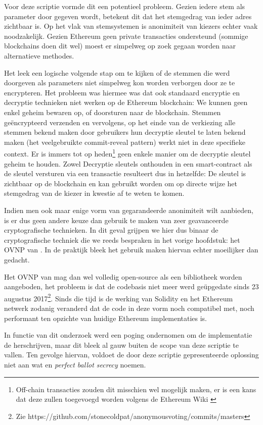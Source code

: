 	Voor deze scriptie vormde dit een potentieel probleem. Gezien iedere stem als parameter door gegeven wordt, betekent dit dat het stemgedrag van ieder adres zichtbaar is. Op het vlak van stemsystemen is anonimiteit van kiezers  echter vaak noodzakelijk. Gezien Ethereum geen private transacties ondersteund (sommige blockchains doen dit wel)  moest er simpelweg op zoek gegaan worden naar alternatieve methodes. 
	
	Het leek een logische volgende stap om te kijken of  de stemmen die werd doorgeven als parameters niet simpelweg kon worden verborgen door ze te encrypteren. Het probleem was hiermee was dat ook standaard encryptie en decryptie technieken niet werken op de Ethereum blockchain: We kunnen geen enkel geheim bewaren op, of doorsturen naar de blockchain. Stemmen geëncrypteerd verzenden en vervolgens, op het einde van de verkiezing alle stemmen bekend maken door gebruikers hun decryptie sleutel te laten bekend maken (het veelgebruikte commit-reveal pattern) werkt niet in deze specifieke context. Er is immers tot op heden\footnote{Off-chain transacties zouden dit misschien wel mogelijk maken, er is een kans dat deze zullen toegevoegd worden volgens de Ethereum Wiki \autocite{Buterin2014}} geen enkele manier om de decryptie sleutel geheim te houden. Zowel Decryptie sleutels onthouden in een smart-contract als de sleutel versturen via een transactie resulteert dus in hetzelfde: De sleutel is zichtbaar op de blockchain en kan gebruikt worden om op directe wijze het stemgedrag van de kiezer in kwestie af te weten te komen.
	
	Indien men ook maar enige vorm van gegarandeerde anonimiteit wilt aanbieden, is er dus geen andere keuze dan gebruik te maken van zeer geavanceerde cryptografische technieken. In dit geval grijpen we hier dus binaar de cryptografische techniek die we reeds bespraken in het vorige hoofdstuk: het OVNP van \textcite{McCorry2017}. In de praktijk bleek het gebruik maken hiervan echter moeilijker dan gedacht. 
	
	 Het OVNP van \textcite{McCorry2017} mag dan wel volledig open-source als een bibliotheek worden aangeboden, het probleem is dat de codebasis niet meer werd geüpgedate sinds 23 augustus 2017\footnote{Zie https://github.com/stonecoldpat/anonymousvoting/commits/masters}. Sinds die tijd is de werking van Solidity en het Ethereum netwerk zodanig  veranderd dat de code in deze vorm noch compatibel met, noch performant ten opzichte van huidige Ethereum implementaties is. 
	 
	 In functie van dit onderzoek werd een poging ondernomen om de implementatie de herschrijven, maar dit bleek al gauw buiten de scope van deze scriptie te vallen. Ten gevolge hiervan, voldoet de door deze scriptie gepresenteerde oplossing niet aan wat \textcite{McCorry2017} en \textcite{Kiayias2002} \textit{perfect ballot secrecy} noemen.

